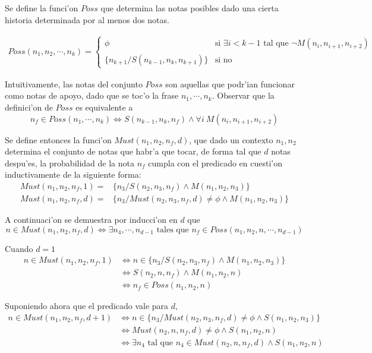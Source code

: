 Se define la funci'on $Poss$ que determina las notas posibles dado una cierta historia determinada por al menos dos notas.

\begin{align}
Poss(n_1, n_2, \cdots, n_k)= \left\{
 \begin{array}{rl}
  \phi & \text{si } \exists i < k-1 \text{ tal que } \neg M(n_i, n_{i+1}, n_{i+2}) \\
   \{n_{k+1} / S(n_{k-1}, n_k, n_{k+1})\} & \text{si no}
 \end{array} \right.
\end{align}

Intuitivamente, las notas del conjunto $Poss$ son aquellas que podr'ian funcionar como notas de apoyo, dado que se toc'o la frase $n_1, \cdots, n_k$. 
Observar que la definici'on de $Poss$ es equivalente a 
$$n_f \in Poss(n_1, \cdots, n_k) \Leftrightarrow S(n_{k-1}, n_k, n_f) \land \forall i\ M(n_i, n_{i+1}, n_{i+2})$$

Se define entonces la funci'on $Must(n_1, n_2, n_f, d)$, que dado un contexto $n_1, n_2$ determina el conjunto de notas que habr'a que tocar, de forma tal
que $d$ notas despu'es, la probabilidad de la nota $n_f$ cumpla con el predicado en cuesti'on inductivamente de la siguiente forma:
\begin{align}
Must(n_1, n_2, n_f, 1)=& \{n_3/ S(n_2, n_3, n_f) \land M(n_1, n_2, n_3)\}\\
Must(n_1, n_2, n_f, d)=& \{n_3/ Must(n_2, n_3, n_f, d) \neq \phi \land M(n_1,n_2, n_3)\}
\end{align}

A continuaci'on se demuestra por inducci'on en $d$ que 
$$n \in Must(n_1, n_2, n_f, d) \Leftrightarrow \exists n_4, \cdots, n_{d-1} \text{ tales que } n_f \in Poss(n_1, n_2, n, \cdots, n_{d-1})$$

Cuando $d=1$
\begin{align*}
n \in Must(n_1, n_2, n_f, 1)   & \Leftrightarrow n \in \{n_3/ S(n_2, n_3, n_f) \land M(n_1, n_2, n_3)\} \\
                               & \Leftrightarrow S(n_2, n, n_f) \land M(n_1, n_2, n)   \\
                               & \Leftrightarrow n_f \in Poss(n_1, n_2, n)
\end{align*}

Suponiendo ahora que el predicado vale para $d$, 
\begin{align}
n \in Must(n_1, n_2, n_f, d+1)   & \Leftrightarrow n \in \{n_3/ Must(n_2, n_3, n_f, d) \neq \phi \land S(n_1,n_2, n_3)\} \\
                                 & \Leftrightarrow Must(n_2, n, n_f, d) \neq \phi \land S(n_1,n_2, n) \\
                                 & \Leftrightarrow \exists n_4 \text{ tal que } n_4 \in Must(n_2, n, n_f, d) \land S(n_1,n_2, n) \label{eq_must}
\end{align}

